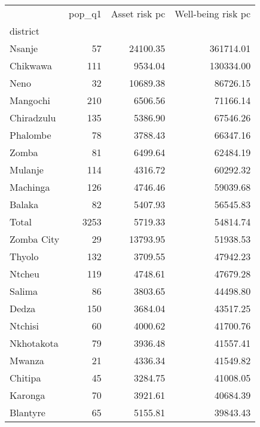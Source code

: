 \begin{tabular}{lrrr}
\toprule
{} &  pop\_q1 &  Asset risk pc &  Well-being risk pc \\
district      &         &                &                     \\
\midrule
Nsanje        &      57 &       24100.35 &           361714.01 \\
Chikwawa      &     111 &        9534.04 &           130334.00 \\
Neno          &      32 &       10689.38 &            86726.15 \\
Mangochi      &     210 &        6506.56 &            71166.14 \\
Chiradzulu    &     135 &        5386.90 &            67546.26 \\
Phalombe      &      78 &        3788.43 &            66347.16 \\
Zomba         &      81 &        6499.64 &            62484.19 \\
Mulanje       &     114 &        4316.72 &            60292.32 \\
Machinga      &     126 &        4746.46 &            59039.68 \\
Balaka        &      82 &        5407.93 &            56545.83 \\
Total         &    3253 &        5719.33 &            54814.74 \\
Zomba City    &      29 &       13793.95 &            51938.53 \\
Thyolo        &     132 &        3709.55 &            47942.23 \\
Ntcheu        &     119 &        4748.61 &            47679.28 \\
Salima        &      86 &        3803.65 &            44498.80 \\
Dedza         &     150 &        3684.04 &            43517.25 \\
Ntchisi       &      60 &        4000.62 &            41700.76 \\
Nkhotakota    &      79 &        3936.48 &            41557.41 \\
Mwanza        &      21 &        4336.34 &            41549.82 \\
Chitipa       &      45 &        3284.75 &            41008.05 \\
Karonga       &      70 &        3921.61 &            40684.39 \\
Blantyre      &      65 &        5155.81 &            39843.43 \\

\end{tabular}
